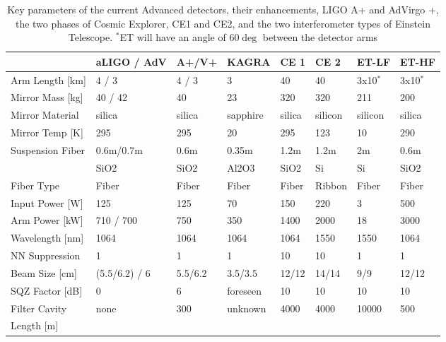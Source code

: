 \begin{table}[ht]
\centering
\begin{tabular}{|l|l|l|p{1.6cm}|l|l|l|l|}
\hline
 &aLIGO / AdV &A+/V+ &KAGRA &CE 1 &CE 2 &ET-LF &ET-HF\\
\hline
Arm Length [km] & 4 / 3 &4 / 3& 3& 40& 40& 3x10$^*$ & 3x10$^*$\\
\hline
Mirror Mass [kg]& 40 / 42& 40& 23& 320& 320& 211& 200\\
\hline
Mirror Material& silica& silica& sapphire& silica& silicon& silicon& silica\\
\hline
Mirror Temp [K]& 295& 295& 20& 295& 123& 10& 290\\
\hline
Suspension Fiber& 0.6m/0.7m& 0.6m& 0.35m& 1.2m& 1.2m& 2m& 0.6m\\
& SiO2& SiO2&Al2O3&SiO2&Si&Si&SiO2\\
\hline
Fiber Type& Fiber& Fiber& Fiber& Fiber& Ribbon& Fiber& Fiber\\
\hline
Input Power [W]& 125& 125& 70& 150& 220& 3& 500\\
\hline
Arm Power [kW]& 710 / 700& 750& 350& 1400& 2000& 18& 3000\\
\hline
Wavelength [nm]& 1064& 1064& 1064& 1064& 1550& 1550& 1064\\
\hline
\acs{NN} Suppression& 1& 1& 1& 10& 10& 1& 1\\
\hline
Beam Size [cm]& (5.5/6.2) / 6& 5.5/6.2& 3.5/3.5& 12/12& 14/14& 9/9& 12/12\\
\hline
\acs{SQZ} Factor [dB]& 0& 6& foreseen& 10& 10& 10& 10\\
\hline
Filter Cavity & none& 300& unknown& 4000& 4000& 10000& 500\\
Length [m] &&&&&&&\\
\hline
\end{tabular}
\caption{Key parameters of the current Advanced detectors, their enhancements, LIGO A+ and AdVirgo +, the two phases of Cosmic Explorer, CE1 and CE2, and the two interferometer types of Einstein Telescope. $^*$\ac{ET} will have an angle of 60$\deg$ between the detector arms}
\label{Tab:FutIfos}
\end{table}

